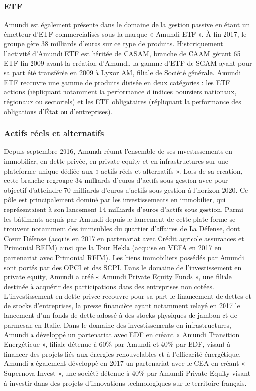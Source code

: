\subsubsection{ETF}
\par Amundi est également présente dans le domaine de la gestion passive en étant un émetteur d'ETF commercialisés sous la marque « Amundi ETF ». À fin 2017, le groupe gère 38 milliards d'euros sur ce type de produits. Historiquement, l'activité d'Amundi ETF est héritée de CASAM, branche de CAAM gérant 65 ETF fin 2009 avant la création d'Amundi, la gamme d'ETF de SGAM ayant pour sa part été transférée en 2009 à Lyxor AM, filiale de Société générale. Amundi ETF recouvre une gamme de produits divisée en deux catégories : les ETF actions (répliquant notamment la performance d'indices boursiers nationaux, régionaux ou sectoriels) et les ETF obligataires (répliquant la performance des obligations d'État ou d'entreprises).
\subsubsection{Actifs réels et alternatifs}
\par Depuis septembre 2016, Amundi réunit l'ensemble de ses investissements en immobilier, en dette privée, en private equity et en infrastructures sur une plateforme unique dédiée aux « actifs réels et alternatifs ». Lors de sa création, cette branche regroupe 34 milliards d'euros d'actifs sous gestion avec pour objectif d'atteindre 70 milliards d'euros d'actifs sous gestion à l'horizon 2020. Ce pôle est principalement dominé par les investissements en immobilier, qui représentaient à son lancement 14 milliards d'euros d'actifs sous gestion. Parmi les bâtiments acquis par Amundi depuis le lancement de cette plate-forme se trouvent notamment des immeubles du quartier d'affaires de La Défense, dont Cœur Défense (acquis en 2017 en partenariat avec Crédit agricole assurances et Primonial REIM) ainsi que la Tour Hekla (acquise en VEFA en 2017 en partenariat avec Primonial REIM). Les biens immobiliers possédés par Amundi sont portés par des OPCI et des SCPI. Dans le domaine de l'investissement en private equity, Amundi a créé « Amundi Private Equity Funds », une filiale destinée à acquérir des participations dans des entreprises non cotées. L'investissement en dette privée recouvre pour sa part le financement de dettes et de stocks d'entreprises, la presse financière ayant notamment relayé en 2017 le lancement d'un fonds de dette adossé à des stocks physiques de jambon et de parmesan en Italie. Dans le domaine des investissements en infrastructures, Amundi a développé un partenariat avec EDF en créant « Amundi Transition Energétique », filiale détenue à 60\% par Amundi et 40\% par EDF, visant à financer des projets liés aux énergies renouvelables et à l'efficacité énergétique. Amundi a également développé en 2017 un partenariat avec le CEA en créant « Supernova Invest », une société détenue à 40\% par Amundi Private Equity visant à investir dans des projets d'innovations technologiques sur le territoire français.
